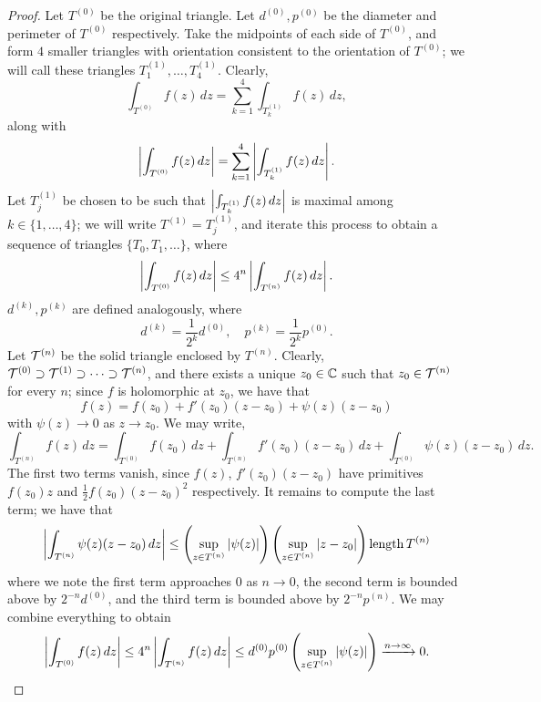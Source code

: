 \begin{proof}
    Let $T^{(0)}$ be the original triangle. Let $d^{(0)}, p^{(0)}$ be the diameter and perimeter of $T^{(0)}$ respectively. Take the midpoints of each side of $T^{(0)}$, and form $4$ smaller triangles with orientation consistent to the orientation of $T^{(0)}$; we will call these triangles $T_1^{(1)}, \dots, T_4^{(1)}$. Clearly,
    \[ \int_{T^{(0)}} f(z) \, dz = \sum_{k=1}^4 \int_{T_k^{(1)}} f(z) \, dz, \]
    along with
    \[ \left\lvert \int_{T^{(0)}} f(z) \, dz \right\rvert = \sum_{k=1}^4 \left\lvert \int_{T_k^{(1)}} f(z) \, dz \right\rvert. \]
    Let $T_j^{(1)}$ be chosen to be such that $\left\lvert \int_{T_k^{(1)}} f(z) \, dz \right\rvert$ is maximal among $k \in \{1, \dots, 4\}$; we will write $T^{(1)} = T_j^{(1)}$, and iterate this process to obtain a sequence of triangles $\{T_0, T_1, \dots\}$, where
    \[ \left\lvert \int_{T^{(0)}} f(z) \, dz \right\rvert \leq 4^n \left\lvert \int_{T^{(n)}} f(z) \, dz \right\rvert. \]
    $d^{(k)}, p^{(k)}$ are defined analogously, where
    \[ d^{(k)} = \frac{1}{2^k} d^{(0)}, \quad p^{(k)} = \frac{1}{2^k} p^{(0)}. \]
    Let $\mathcal T^{(n)}$ be the solid triangle enclosed by $T^{(n)}$. Clearly, $\mathcal T^{(0)} \supset \mathcal T^{(1)} \supset \dots \supset \mathcal T^{(n)}$, and there exists a unique $z_0 \in \mathbb C$ such that $z_0 \in \mathcal T^{(n)}$ for every $n$; since $f$ is holomorphic at $z_0$, we have that
    \[ f(z) = f(z_0) + f'(z_0)(z - z_0) + \psi(z)(z - z_0) \]
    with $\psi(z) \to 0$ as $z \to z_0$. We may write,
    \[ \int_{T^{(n)}} f(z) \, dz = \int_{T^{(0)}} f(z_0) \, dz + \int_{T^{(n)}} f'(z_0) (z - z_0) \, dz + \int_{T^{(0)}} \psi(z) (z - z_0) \, dz. \]
    The first two terms vanish, since $f(z)$, $f'(z_0)(z - z_0)$ have primitives $f(z_0) z$ and $\frac{1}{2} f(z_0) (z - z_0)^2$ respectively. It remains to compute the last term; we have that
    \[ \left\lvert \int_{T^{(n)}} \psi(z) (z - z_0) \, dz \right\rvert \leq \left(\sup_{z \in T^{(n)}} \left\lvert \psi(z) \right\rvert\right) \left(\sup_{z \in T^{(n)}} \left\lvert z - z_0 \right\rvert\right) \operatorname{length} T^{(n)} \]
    where we note the first term approaches $0$ as $n \to 0$, the second term is bounded above by $2^{-n} d^{(0)}$, and the third term is bounded above by $2^{-n} p^{(n)}$. We may combine everything to obtain
    \[ \left\lvert \int_{T^{(0)}} f(z) \, dz \right\rvert \leq 4^n \left\lvert \int_{T^{(n)}} f(z) \, dz \right\rvert \leq d^{(0)} p^{(0)} \left(\sup_{z \in T^{(n)}} \left\lvert \psi(z) \right\rvert\right) \xrightarrow{n \to \infty} 0. \qedhere \]
\end{proof}